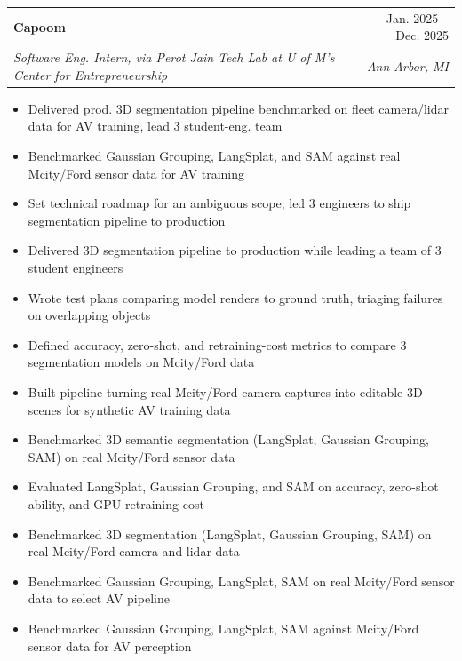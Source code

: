 \documentclass[letterpaper,11pt]{article}
\makeatletter
\newcommand{\resumeItem}[1]{
  \item\small{
    {#1 \vspace{-2pt}}
  }
}
\newcommand{\resumeSubheading}[4]{
  \vspace{-2pt}\item
    \begin{tabular*}{0.97\textwidth}[t]{l@{\extracolsep{\fill}}r}
      \textbf{#1} & #2 \\
      \textit{\small#3} & \textit{\small #4} \\
    \end{tabular*}\vspace{-7pt}
}
\newcommand{\resumeItemListStart}{\begin{itemize}}
\newcommand{\resumeItemListEnd}{\end{itemize}\vspace{-5pt}}
\makeatother
\begin{document}
    \resumeSubheading
      {Capoom}{Jan. 2025 -- Dec. 2025}
      {Software Eng. Intern, via Perot Jain Tech Lab at U of M's Center for Entrepreneurship}{Ann Arbor, MI}
      \resumeItemListStart
        \resumeItem{Delivered prod. 3D segmentation pipeline benchmarked on fleet camera/lidar data for AV training, lead 3 student-eng. team}
        \resumeItem{Benchmarked Gaussian Grouping, LangSplat, and SAM against real Mcity/Ford sensor data for AV training}
        \resumeItem{Set technical roadmap for an ambiguous scope; led 3 engineers to ship segmentation pipeline to production}
        \resumeItem{Delivered 3D segmentation pipeline to production while leading a team of 3 student engineers}
        \resumeItem{Wrote test plans comparing model renders to ground truth, triaging failures on overlapping objects}
        \resumeItem{Defined accuracy, zero-shot, and retraining-cost metrics to compare 3 segmentation models on Mcity/Ford data}
        \resumeItem{Built pipeline turning real Mcity/Ford camera captures into editable 3D scenes for synthetic AV training data}
        \resumeItem{Benchmarked 3D semantic segmentation (LangSplat, Gaussian Grouping, SAM) on real Mcity/Ford sensor data}
        \resumeItem{Evaluated LangSplat, Gaussian Grouping, and SAM on accuracy, zero-shot ability, and GPU retraining cost}
        \resumeItem{Benchmarked 3D segmentation (LangSplat, Gaussian Grouping, SAM) on real Mcity/Ford camera and lidar data}
        \resumeItem{Benchmarked Gaussian Grouping, LangSplat, SAM on real Mcity/Ford sensor data to select AV pipeline}
        \resumeItem{Benchmarked Gaussian Grouping, LangSplat, SAM against Mcity/Ford sensor data for AV perception}
      \resumeItemListEnd
\end{document}
